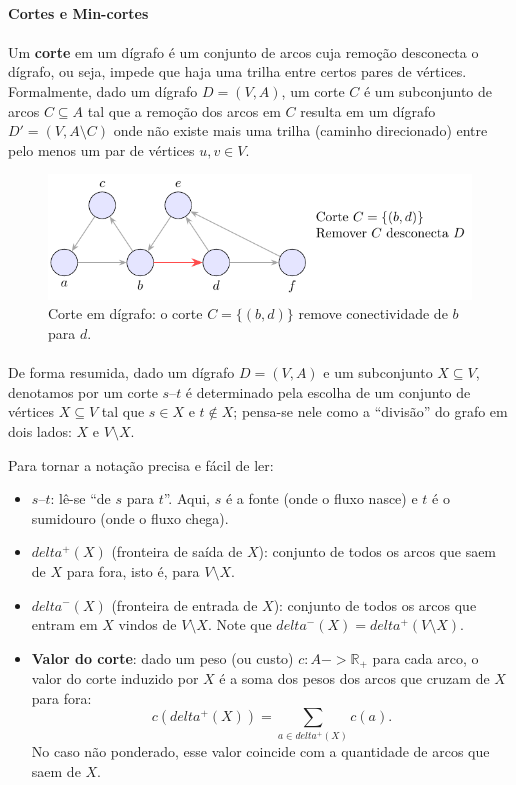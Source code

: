 \documentclass[12pt,a4paper]{article}
\def\emph#1{#1}%
\def\to{->}%
\def\delta{delta}%
\begin{document}
\paragraph{Cortes e Min-cortes}
\paragraph{}
Um \textbf{corte} em um dígrafo é um conjunto de arcos cuja remoção desconecta o dígrafo, ou seja, impede que haja uma trilha entre certos pares de vértices. Formalmente, dado um dígrafo \(D = (V, A)\), um corte \(C\) é um subconjunto de arcos \(C \subseteq A\) tal que a remoção dos arcos em \(C\) resulta em um dígrafo \(D' = (V, A \setminus C)\) onde não existe mais uma trilha (caminho direcionado) entre pelo menos um par de vértices \(u, v \in V\).


\begin{figure}[H]
    \centering
    \includegraphics[width=0.9\linewidth]{figures/fig_corte.pdf}

    \caption{Corte em dígrafo: o corte $C=\{(b,d)\}$ remove conectividade de $b$ para $d$.}
    \label{fig:corte}
    \end{figure}


\paragraph{}
De forma resumida, dado um dígrafo \(D=(V,A)\) e um subconjunto \(X\subseteq V\), denotamos por um corte \(s\text{--}t\) é determinado pela escolha de um conjunto de vértices \(X\subseteq V\) tal que \(s\in X\) e \(t\notin X\); pensa-se nele como a “divisão” do grafo em dois lados: \(X\) e \(V\setminus X\).

Para tornar a notação precisa e fácil de ler:
\begin{itemize}
    \item \textbf{\(s\text{--}t\)}: lê-se “de \(s\) para \(t\)”. Aqui, \(s\) é a fonte (onde o fluxo nasce) e \(t\) é o sumidouro (onde o fluxo chega).
    \item \textbf{\(\delta^+(X)\)} (fronteira de saída de \(X\)): conjunto de todos os arcos que \emph{saem} de \(X\) para fora, isto é, para \(V\setminus X\).
    \item \textbf{\(\delta^-(X)\)} (fronteira de entrada de \(X\)): conjunto de todos os arcos que \emph{entram} em \(X\) vindos de \(V\setminus X\). Note que \(\delta^-(X)=\delta^+(V\setminus X)\).
    \item \textbf{Valor do corte}: dado um peso (ou custo) \(c:A\to\mathbb{R}_+\) para cada arco, o valor do corte induzido por \(X\) é a soma dos pesos dos arcos que cruzam de \(X\) para fora: 
    \[c(\delta^+(X))=\sum_{a\in\delta^+(X)} c(a).\]
    No caso não ponderado, esse valor coincide com a \emph{quantidade} de arcos que saem de \(X\).
\end{itemize}
\end{document}

